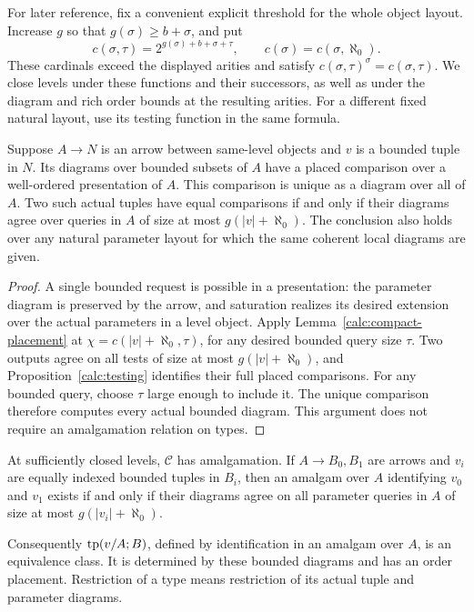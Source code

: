 For later reference, fix a convenient explicit threshold for the whole
object layout.  Increase $g$ so that $g(\sigma)\ge b+\sigma$, and put
\begin{equation}
\label{calc:test-threshold}
 c(\sigma,\tau)=2^{g(\sigma)+b+\sigma+\tau},
 \qquad c(\sigma)=c(\sigma,\aleph_0).
\end{equation}
These cardinals exceed the displayed arities and satisfy
$c(\sigma,\tau)^\sigma=c(\sigma,\tau)$.  We close levels under these
functions and their successors, as well as under the diagram and rich
order bounds at the resulting arities.  For a different fixed natural
layout, use its testing function in the same formula.

\begin{lemma}
\label{calc:placed-comparisons}
Suppose $A\to N$ is an arrow between same-level objects and $v$ is a
bounded tuple in $N$.  Its diagrams over bounded subsets of $A$ have a
placed comparison over a well-ordered presentation of $A$.  This
comparison is unique as a diagram over all of $A$.  Two such actual
tuples have equal comparisons if and only if their diagrams agree over
queries in $A$ of size at most $g(|v|+\aleph_0)$.
The conclusion also holds over any natural parameter layout for which
the same coherent local diagrams are given.
\end{lemma}

\begin{proof}
A single bounded request is possible in a presentation: the parameter
diagram is preserved by the arrow, and saturation realizes its desired
extension over the actual parameters in a level object.  Apply
Lemma~\ref{calc:compact-placement} at
$\chi=c(|v|+\aleph_0,\tau)$, for any desired bounded query size $\tau$.
Two outputs agree on all tests of size at most $g(|v|+\aleph_0)$, and
Proposition~\ref{calc:testing} identifies their full placed comparisons.
For any bounded query, choose $\tau$ large enough to include it.  The
unique comparison therefore computes every actual bounded diagram.
This argument does not require an amalgamation relation on types.
\end{proof}

\begin{theorem}
\label{calc:scheme-amalgamation}
At sufficiently closed levels, $\mathcal C$ has amalgamation.  If
$A\to B_0,B_1$ are arrows and $v_i$ are equally indexed bounded tuples
in $B_i$, then an amalgam over $A$ identifying $v_0$ and $v_1$ exists
if and only if their diagrams agree on all parameter queries in $A$ of
size at most $g(|v_i|+\aleph_0)$.

Consequently $\operatorname{tp}(v/A;B)$, defined by identification in an amalgam over
$A$, is an equivalence class.  It is determined by these bounded
diagrams and has an order placement.  Restriction of a type means
restriction of its actual tuple and parameter diagrams.
\end{theorem}

